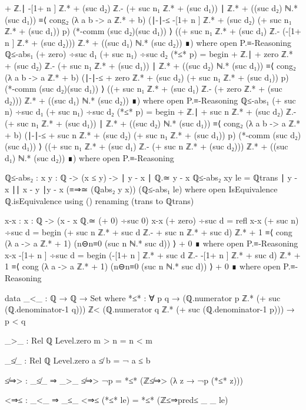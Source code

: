 \documentclass[11pt,a4paper]{article}
\begin{document}
\begin{code}
    + ℤ.∣ -[1+ n ] ℤ.* + (suc d₂) ℤ.- (+ suc n₁ ℤ.* + (suc d₁)) ∣
    ℤ.* + ((suc d₂) ℕ.* (suc d₁)) ≡⟨ cong₂ (λ a b -> a ℤ.* + b)
    (∣-∣-≤ { -[1+ n ] ℤ.* + (suc d₂)}{ (+ suc n₁ ℤ.* + (suc d₁))} p)
    (*-comm (suc d₂)(suc d₁)) ⟩
  ((+ suc n₁ ℤ.* + (suc d₁) ℤ.- (-[1+ n ] ℤ.* + (suc d₂))) ℤ.*
  + ((suc d₁) ℕ.* (suc d₂)) ∎)
     where
     open P.≡-Reasoning
ℚ≤-abs₁ {(+ zero) ÷suc d₁} {(+ suc n₁) ÷suc d₂} (*≤* p) = begin
    + ℤ.∣ + zero ℤ.* + (suc d₂) ℤ.- (+ suc n₁ ℤ.* + (suc d₁)) ∣ ℤ.*
    + ((suc d₂) ℕ.* (suc d₁)) ≡⟨ cong₂ (λ a b -> a ℤ.* + b)
    (∣-∣-≤ { + zero ℤ.* + (suc d₂)}{ (+ suc n₁ ℤ.* + (suc d₁))} p)
    (*-comm (suc d₂)(suc d₁)) ⟩
  ((+ suc n₁ ℤ.* + (suc d₁) ℤ.- (+ zero ℤ.* + (suc d₂))) ℤ.*
  + ((suc d₁) ℕ.* (suc d₂)) ∎)
     where
     open P.≡-Reasoning
ℚ≤-abs₁ {(+ suc n) ÷suc d₁} {(+ suc n₁) ÷suc d₂} (*≤* p) = begin
    + ℤ.∣ + suc n ℤ.* + (suc d₂) ℤ.- (+ suc n₁ ℤ.* + (suc d₁)) ∣
    ℤ.* + ((suc d₂) ℕ.* (suc d₁)) ≡⟨ cong₂ (λ a b -> a ℤ.* + b)
    (∣-∣-≤ { + suc n ℤ.* + (suc d₂)}{ (+ suc n₁ ℤ.* + (suc d₁))} p)
    (*-comm (suc d₂)(suc d₁)) ⟩
  ((+ suc n₁ ℤ.* + (suc d₁) ℤ.- (+ suc n ℤ.* + (suc d₂))) ℤ.*
  + ((suc d₁) ℕ.* (suc d₂)) ∎)
     where
     open P.≡-Reasoning

ℚ≤-abs₂ : {x y : ℚ} -> (x ≤ y) -> ∣ y - x ∣ ℚ.≃ y - x
ℚ≤-abs₂ {x}{y} le = ℚtrans {∣ y - x ∣}{∣ x - y ∣}{y - x}
  (≡⇒≃ (ℚabs₂ y x)) (ℚ≤-abs₁ le)
  where
  open IsEquivalence ℚ.isEquivalence using ()
       renaming (trans to ℚtrans)

x-x : {x : ℚ} -> (x - x ℚ.≃ (+ 0) ÷suc 0)
x-x {(+ zero) ÷suc d} = refl
x-x {(+ suc n) ÷suc d} = begin (+ suc n ℤ.* + suc d ℤ.-
  + suc n ℤ.* + suc d) ℤ.* + 1
    ≡⟨ cong (λ a -> a ℤ.* + 1) (n⊖n≡0 (suc n ℕ.* suc d))  ⟩
    + 0 ∎
    where
      open P.≡-Reasoning
x-x { -[1+ n ] ÷suc d} = begin (-[1+ n ] ℤ.* + suc d ℤ.-
  -[1+ n ] ℤ.* + suc d) ℤ.* + 1
    ≡⟨ cong (λ a -> a ℤ.* + 1) (n⊖n≡0 (suc n ℕ.* suc d))  ⟩
    + 0 ∎
    where
      open P.≡-Reasoning

data _<_ : ℚ → ℚ → Set where
  *≤* : ∀ {p q} →
        (ℚ.numerator p ℤ.* (+ suc (ℚ.denominator-1 q))) ℤ<
        (ℚ.numerator q ℤ.* (+ suc (ℚ.denominator-1 p))) →
        p < q

_>_ : Rel ℚ Level.zero
m > n = n < m

_≰_ : Rel ℚ Level.zero
a ≰ b = ¬ a ≤ b

≰⇒> : _≰_ ⇒ _>_
≰⇒> ¬p = *≤* (ℤ≰⇒> (λ z → ¬p (*≤* z)))

<⇒≤ : _<_ ⇒ _≤_
<⇒≤ (*≤* le) = *≤* (ℤ≤⇒pred≤ _ _ le)


\end{code}
\end{document}
